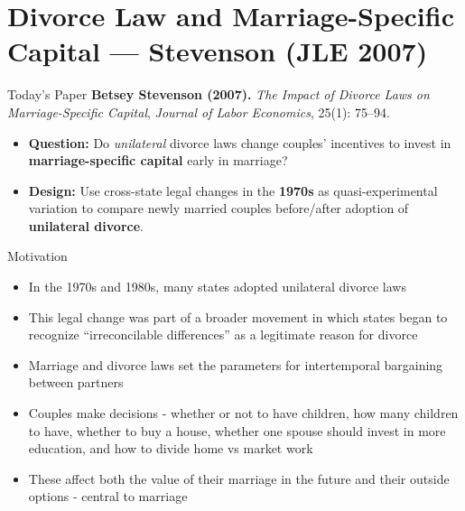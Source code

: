 \documentclass[11pt,notes=hide,aspectratio=169,mathserif]{beamer}
\begin{document}
\section{Divorce Law and Marriage-Specific Capital — Stevenson (JLE 2007)}

\begin{frame}{Today's Paper}
\small
\textbf{Betsey Stevenson (2007).} \emph{The Impact of Divorce Laws on Marriage-Specific Capital}, \textit{Journal of Labor Economics}, 25(1): 75–94.\\[0.6em]
\begin{itemize}
  \item \textbf{Question:} Do \emph{unilateral} divorce laws change couples’ incentives to invest in \textbf{marriage-specific capital} early in marriage?
  \item \textbf{Design:} Use cross-state legal changes in the \textbf{1970s} as quasi-experimental variation to compare newly married couples before/after adoption of \textbf{unilateral divorce}.
\end{itemize}
\end{frame}

\begin{frame}{Motivation}
\small
\begin{itemize}
  \item In the 1970s and 1980s, many states adopted unilateral divorce laws
  \item This legal change
  was part of a broader movement in which states began to recognize “irreconcilable differences” as a legitimate reason for divorce
  \item Marriage and divorce laws set the parameters for intertemporal bargaining
  between partners
  \item Couples make decisions - whether or not to have children, how
  many children to have, whether to buy a house, whether one spouse
  should invest in more education, and how to divide home vs market
  work
  \item These affect both the value of their marriage in the future and their
  outside options - central to marriage
\end{itemize}
\end{frame}
\end{document}
